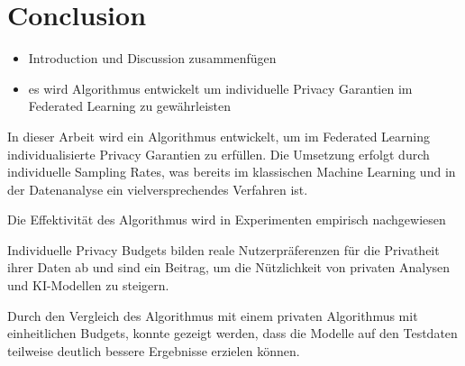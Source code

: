 \chapter{Conclusion}

\begin{itemize}
	\item Introduction und Discussion zusammenfügen
	\item es wird Algorithmus entwickelt um individuelle Privacy Garantien im Federated Learning zu gewährleisten
\end{itemize}

In dieser Arbeit wird ein Algorithmus entwickelt, um im Federated Learning individualisierte Privacy Garantien zu erfüllen. Die Umsetzung erfolgt durch individuelle Sampling Rates, was bereits im klassischen Machine Learning und in der Datenanalyse ein vielversprechendes Verfahren ist.

Die Effektivität des Algorithmus wird in Experimenten empirisch nachgewiesen 

Individuelle Privacy Budgets bilden reale Nutzerpräferenzen für die Privatheit ihrer Daten ab und sind ein Beitrag, um die Nützlichkeit von privaten Analysen und KI-Modellen zu steigern.

Durch den Vergleich des Algorithmus mit einem privaten Algorithmus mit einheitlichen Budgets, konnte gezeigt werden, dass die Modelle auf den Testdaten teilweise deutlich bessere Ergebnisse erzielen können.
